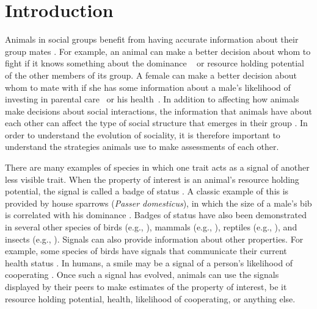 \section*{Introduction} 
Animals in social groups benefit from having accurate information about their group mates \citep{Seyfarth:2010bh}. For example, an animal can make a better decision about whom to fight if it knows something about the dominance ~\citep{Waal:1986ys,Cowlishaw:1990vn,Bergman:2003qf,Seyfarth:2005ve,Flack:2006uq,Hobson:2015uq} or resource holding potential~\citep{Rhijn:1980uq,Freeman:1985kl,Dick:1990cr,Lemel:1993ve,Part:1997ys} of the other members of its group. A female can  make a better decision about whom to mate with if she has some information about a male's likelihood of investing in parental care~\citep{Qvarnstrom:1997fk,McGlothlin:2007au,Olsen:2010uq} or his health~\citep{Folstad:1992kx,Loyau:2005nx}. In addition to affecting how animals make decisions about social interactions, the information that animals have about each other can affect the type of social structure that emerges in their group \citep{Dugatkin:2004hz,Hobson:2015uq,Brush:2018ss}. In order to understand the evolution of sociality, it is therefore important to understand the strategies animals use to make assessments of each other.  

There are many examples of species in which one trait acts as a signal of another less visible trait. When the property of interest is an animal's resource holding potential, the signal is called a badge of status \citep{dawkins1978signals,Rohwer:1981vn,Rohwer:1982fk,Ripoll:2004vn,sheehan2016evotradeoff}. A classic example of this is provided by house sparrows (\emph{Passer domesticus}), in which the size of a male's bib is correlated with his dominance \citep{Veiga:1993fk,Veiga:1995ys}. Badges of status have also been demonstrated in several other species of birds (e.g., \citep{Remy:2010fk,Olsen:2010uq,Lemel:1993ve,Tibbetts:2009kx}), mammals (e.g., \citep{Gerald:2001zm}), reptiles (e.g., \citep{Fox:1990hd}), and insects (e.g., \citep{Tibbetts:2004kx}). Signals can also provide information about other properties. For example, some species of birds have signals that communicate their current health status \citep{Folstad:1992kx,Loyau:2005nx}. In humans, a smile may be a signal of a person's likelihood of cooperating \citep{Schug:2010be}. Once such a signal has evolved, animals can use the signals displayed by their peers to make estimates of the property of interest, be it resource holding potential, health, likelihood of cooperating, or anything else.

